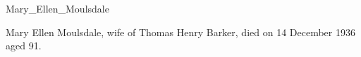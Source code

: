 \cite{Mary Ellen Moulsdale}{Mary_Ellen_Moulsdale}{}

Mary Ellen Moulsdale, wife of Thomas Henry Barker, died on 14 December 1936 aged 91.\cite{ToxtethBarker20}

